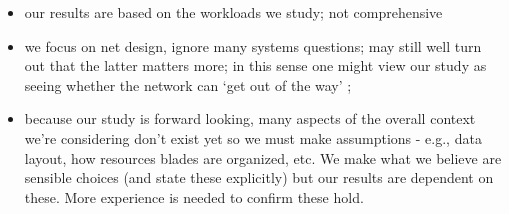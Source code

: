 \begin{itemize} 
\item our results are based on the workloads we study; not comprehensive
\item we focus on net design, ignore many systems questions; may still well turn out that the latter matters more; in this sense one might view our study as seeing whether the network can `get out of the way’ \cite{};
\item because our study is forward looking, many aspects of the overall context we’re considering don’t exist yet so we must make assumptions - e.g., data layout, how resources blades are organized, etc.  We make what we believe are sensible choices (and state these explicitly) but our results are dependent on these. More experience is needed to confirm these hold.
\end{itemize} 



